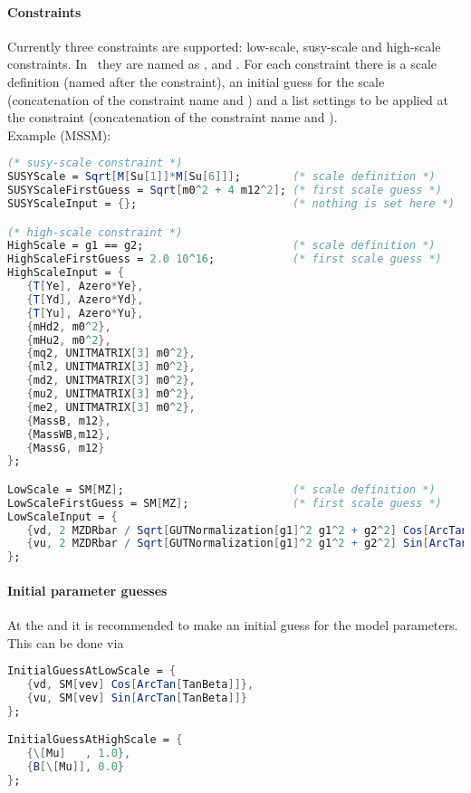 \paragraph{Constraints}
Currently three constraints are supported: low-scale, susy-scale and
high-scale constraints.  In \flexisusy\ they are named as
,  and .  For
each constraint there is a scale definition (named after the
constraint), an initial guess for the scale (concatenation of the
constraint name and ) and a list settings to be
applied at the constraint (concatenation of the constraint name and
).
\\
Example (MSSM):
\begin{lstlisting}[language=Mathematica]
(* susy-scale constraint *)
SUSYScale = Sqrt[M[Su[1]]*M[Su[6]]];        (* scale definition *)
SUSYScaleFirstGuess = Sqrt[m0^2 + 4 m12^2]; (* first scale guess *)
SUSYScaleInput = {};                        (* nothing is set here *)

(* high-scale constraint *)
HighScale = g1 == g2;                       (* scale definition *)
HighScaleFirstGuess = 2.0 10^16;            (* first scale guess *)
HighScaleInput = {
   {T[Ye], Azero*Ye},
   {T[Yd], Azero*Yd},
   {T[Yu], Azero*Yu},
   {mHd2, m0^2},
   {mHu2, m0^2},
   {mq2, UNITMATRIX[3] m0^2},
   {ml2, UNITMATRIX[3] m0^2},
   {md2, UNITMATRIX[3] m0^2},
   {mu2, UNITMATRIX[3] m0^2},
   {me2, UNITMATRIX[3] m0^2},
   {MassB, m12},
   {MassWB,m12},
   {MassG, m12}
};

LowScale = SM[MZ];                          (* scale definition *)
LowScaleFirstGuess = SM[MZ];                (* first scale guess *)
LowScaleInput = {
   {vd, 2 MZDRbar / Sqrt[GUTNormalization[g1]^2 g1^2 + g2^2] Cos[ArcTan[TanBeta]]},
   {vu, 2 MZDRbar / Sqrt[GUTNormalization[g1]^2 g1^2 + g2^2] Sin[ArcTan[TanBeta]]}
};
\end{lstlisting}

\paragraph{Initial parameter guesses} At the  and
 it is recommended to make an initial guess for the
model parameters.  This can be done via
\begin{lstlisting}[language=Mathematica]
InitialGuessAtLowScale = {
   {vd, SM[vev] Cos[ArcTan[TanBeta]]},
   {vu, SM[vev] Sin[ArcTan[TanBeta]]}
};

InitialGuessAtHighScale = {
   {\[Mu]   , 1.0},
   {B[\[Mu]], 0.0}
};
\end{lstlisting}

